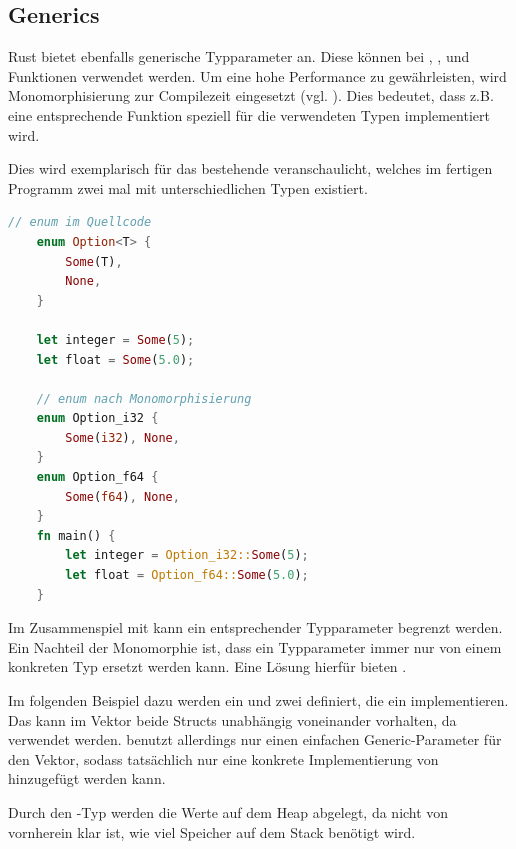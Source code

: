 \documentclass[11pt,a4paper, ngerman]{article}
\begin{document}
\subsection{Generics}
Rust bietet ebenfalls generische Typparameter an. Diese können bei , ,  und Funktionen verwendet werden. Um eine hohe Performance zu gewährleisten, wird Monomorphisierung zur Compilezeit eingesetzt (vgl. \cite[S. 196 ff.]{SK19}). Dies bedeutet, dass z.B. eine entsprechende Funktion speziell für die verwendeten Typen implementiert wird.

Dies wird exemplarisch für das bestehende   veranschaulicht, welches im fertigen Programm zwei mal mit unterschiedlichen Typen existiert.

\begin{lstlisting}[language=rust, caption={Monomorphisierung Veranschaulichung \cite{MonoCodeEx}}]
    // enum im Quellcode
    enum Option<T> {
        Some(T),
        None,
    }

    let integer = Some(5);
    let float = Some(5.0);
    
    // enum nach Monomorphisierung
    enum Option_i32 {
        Some(i32), None,
    }
    enum Option_f64 {
        Some(f64), None,
    }
    fn main() {
        let integer = Option_i32::Some(5);
        let float = Option_f64::Some(5.0);
    }
\end{lstlisting}

Im Zusammenspiel mit  kann ein entsprechender Typparameter begrenzt werden. Ein Nachteil der Monomorphie ist, dass ein Typparameter immer nur von einem konkreten Typ ersetzt werden kann. Eine Lösung hierfür bieten .

Im folgenden Beispiel dazu werden ein  und zwei  definiert, die ein  implementieren. Das  kann im Vektor  beide Structs unabhängig voneinander vorhalten, da  verwendet werden.  benutzt allerdings nur einen einfachen Generic-Parameter für den Vektor, sodass tatsächlich nur eine konkrete Implementierung von  hinzugefügt werden kann.

Durch den -Typ werden die Werte auf dem Heap abgelegt, da nicht von vornherein klar ist, wie viel Speicher auf dem Stack benötigt wird.
\end{document}
